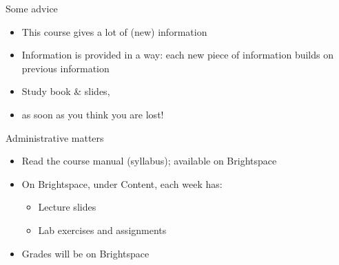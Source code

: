 \documentclass[aspectratio=169,usenames,dvipsnames]{beamer}
\begin{document}

\begin{frame}{Some advice}
    \begin{itemize}
        \item This course gives a lot of (new) information
        \item Information is provided in a  way:
            each new piece of information builds on previous information
        \item Study book \& slides, 
        \item {} as soon as you think you are lost!
    \end{itemize}
\end{frame}

\begin{frame}{Administrative matters}
    \begin{itemize}
        \item Read the course manual (syllabus); available on Brightspace
        \item On Brightspace, under Content, each week has:
            \begin{itemize}
                \item Lecture slides
                \item Lab exercises and assignments
            \end{itemize}
        \item Grades will be on Brightspace %
    \end{itemize}
\end{frame}
\end{document}
